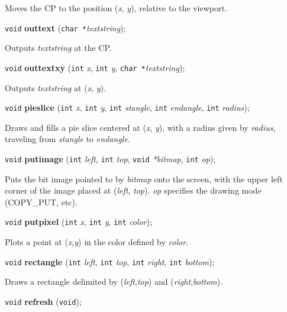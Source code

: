 \documentclass[a4paper,11pt]{article}
\newcommand{\V}{\texttt{void}}      %
\newcommand{\I}{\texttt{int}}       %
\newcommand{\C}{\texttt{char *}}    %
\newcommand{\func}[1]{\textbf{#1}}  %
\newcommand{\A}[1]{\emph{#1}}       %
\newenvironment{bgi}
{ %
  \begin{snugshade}
}
{ %
  \end{snugshade}
}
\begin{document}
Moves the CP to the position (\A{x}, \A{y}), relative to the
viewport.


\begin{bgi}
\V{} \func{outtext} (\C{}\A{textstring});
\end{bgi}

Outputs \A{textstring} at the CP.


\begin{bgi}
\V{} \func{outtextxy} (\I{} \A{x}, \I{} \A{y}, \C{}\A{textstring});
\end{bgi}

Outputs \A{textstring} at (\A{x}, \A{y}).


\begin{bgi}
\V{} \func{pieslice} (\I{} \A{x}, \I{} \A{y}, \I{} \A{stangle}, \I{}
\A{endangle}, \I{} \A{radius});
\end{bgi}

Draws and fills a pie slice centered at (\A{x}, \A{y}), with a radius
given by \A{radius}, traveling from \A{stangle} to \A{endangle}.


\begin{bgi}
\V{} \func{putimage} (\I{} \A{left}, \I{} \A{top}, \V{} \A{*bitmap},
\I{} \A{op});
\end{bgi}

Puts the bit image pointed to by \A{bitmap} onto the screen, with the
upper left corner of the image placed at (\A{left}, \A{top}). \A{op}
specifies the drawing mode (COPY\_PUT, etc).


\begin{bgi}
\V{} \func{putpixel} (\I{} \A{x}, \I{} \A{y}, \I{} \A{color}); 
\end{bgi}

Plots a point at (\A{x},\A{y}) in the color defined by \A{color}.


\begin{bgi}
\V{} \func{rectangle} (\I{} \A{left}, \I{} \A{top}, \I{} \A{right},
\I{} \A{bottom});
\end{bgi}

Draws a rectangle delimited by (\A{left},\A{top}) and
(\A{right},\A{bottom}).


\begin{bgi}
\V{} \func{refresh} (\V{});
\end{bgi}
\end{document}
